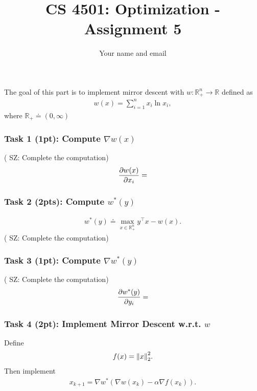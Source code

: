 \documentclass[11pt]{article}
\newcommand{\sz}[1]{({\color{blue} {SZ: #1}})}
\newcommand{\R}{\mathbb{R}}
\begin{document}
\title{CS 4501: Optimization - Assignment 5}
\author{Your name and email}
\date{}
\maketitle

\part{}

The goal of this part is to implement mirror descent with $w: \R^n_+ \to \R$ defined as
\begin{align}
  w(x) = \sum_{i=1}^n x_i \ln x_i,
\end{align}
where $\R_+ \doteq (0, \infty)$

\section*{Task 1 (1pt): Compute $\nabla w(x)$}
  \sz{Complete the computation}
\begin{align}
  \pdv{w(x)}{x_i} = 
\end{align}

\section*{Task 2 (2pts): Compute $w^*(y)$}
\begin{align}
  w^*(y) \doteq \max_{x \in \R^n_+} y^\top x - w(x).
\end{align}
  \sz{Complete the computation}

\section*{Task 3 (1pt): Compute $\nabla w^*(y)$}
  \sz{Complete the computation}
\begin{align}
  \pdv{w^*(y)}{y_i} = 
\end{align}

\section*{Task 4 (2pt): Implement Mirror Descent w.r.t. $w$}
Define 
\begin{align}
  f(x) = \norm{x}^2_2.
\end{align}
Then implement
\begin{align}
  x_{k+1} = \nabla w^*\left(\nabla w(x_k) - \alpha \nabla f(x_k)\right).
\end{align}
\end{document}
